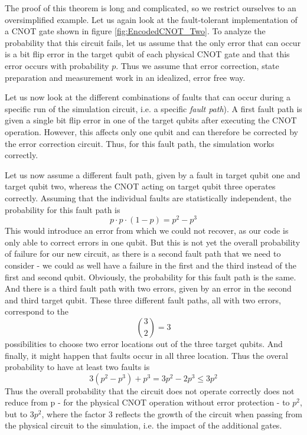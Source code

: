 \documentclass[a4paper, draft]{article}
\theoremstyle{own}
\theoremstyle{remark}
\begin{document}
The proof of this theorem is long and complicated, so we restrict ourselves to an oversimplified example. Let us again look at the fault-tolerant implementation of a CNOT gate shown in figure \ref{fig:EncodedCNOT_Two}. To analyze the probability that this circuit fails, let us assume that the only error that can occur is a bit flip error in the target qubit of each physical CNOT gate and that this error occurs with probability $p$. Thus we assume that error correction, state preparation and measurement work in an idealized, error free way.

Let us now look at the different combinations of faults that can occur during a specific run of the simulation circuit, i.e. a specific \emph{fault path}). A first fault path is given a single bit flip error in one of the target qubits after executing the CNOT operation. However, this affects only one qubit and can therefore be corrected by the error correction circuit. Thus, for this fault path, the simulation works correctly.

Let us now assume a different fault path, given by a fault in target qubit one and target qubit two, whereas the CNOT acting on target qubit three operates correctly. Assuming that the individual faults are statistically independent, the probability for this fault path is
$$
p \cdot p \cdot (1 - p) = p^2 - p^3 
$$
This would introduce an error from which we could not recover, as our code is only able to correct errors in one qubit. But this is not yet the overall probability of failure for our new circuit, as there is a second fault path that we need to consider - we could as well have a failure in the first and the third instead of the first and second qubit. Obviously, the probability for this fault path is the same. And there is a third fault path with two errors, given by an error in the second and third target qubit. These three different fault paths, all with two errors, correspond to the 
$$
{{3} \choose {2}} = 3
$$
possibilities to choose two error locations out of the three target qubits. And finally, it might happen that faults occur in all three location. Thus the overal probability to have at least two faults is
$$
3 (p^2 - p^3) + p^3 = 3 p^2 - 2 p^3 \leq 3 p^2
$$
Thus the overall probability that the circuit does not operate correctly does not reduce from p - for the physical CNOT operation without error protection - to $p^2$, but to $3 p^2$, where the factor $3$ reflects the growth of the circuit when passing from the physical circuit to the simulation, i.e. the impact of the additional gates.
\end{document}
